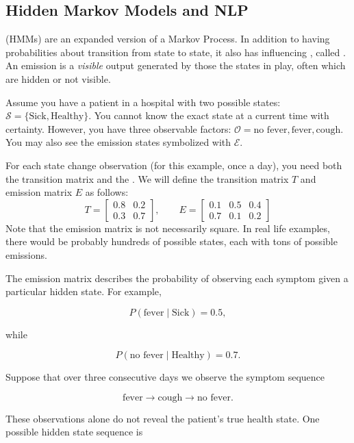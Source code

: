 \subsection{Hidden Markov Models and NLP}
 (HMMs) are an expanded version of a Markov Process. In addition to having probabilities about transition from state to state, it also has influencing , called . An emission is a \emph{visible} output generated by those the states in play, often which are hidden or not visible.

Assume you have a patient in a hospital with two possible states: $\mathcal{S} = \{\text{Sick}, \text{Healthy}\}$. You cannot know the exact state at a current time with certainty. However, you have three observable factors: $\mathcal{O} = \text{no fever}, \text{fever}, \text{cough}$. You may also see the emission states symbolized with $\mathcal{E}$.

For each state change observation (for this example, once a day), you need both the transition matrix and the . We will define the transition matrix $T$ and emission matrix $E$ as follows:
\[T = \begin{bmatrix}
        0.8 & 0.2 \\ %
        0.3 & 0.7 %
    \end{bmatrix}, \qquad
    E=\begin{bmatrix}
        0.1 & 0.5 & 0.4 \\
        0.7 & 0.1 & 0.2
    \end{bmatrix}\]
Note that the emission matrix is not necessarily square. In real life examples, there would be probably hundreds of possible states, each with tons of possible emissions.

The emission matrix describes the probability of observing each symptom given a particular hidden state. For example,

\[
    P(\text{fever} \mid \text{Sick}) = 0.5,
\]

while

\[
    P(\text{no fever} \mid \text{Healthy}) = 0.7.
\]

Suppose that over three consecutive days we observe the symptom sequence

\[
    \text{fever} \rightarrow \text{cough} \rightarrow \text{no fever}.
\]

These observations alone do not reveal the patient's true health state. One possible hidden state sequence is

